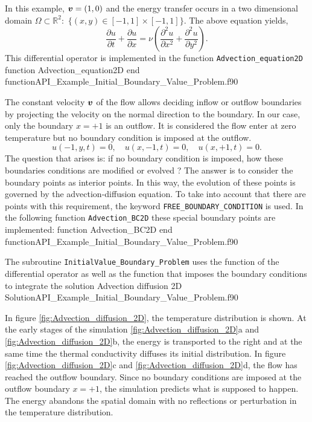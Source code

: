  In this example, $ \boldsymbol{v} = (1, 0) $ and the energy transfer occurs  in a two dimensional domain
  $\Omega \subset \mathbb{R}^2 : $ $\{(x,y)\in  [-1,1]\times[-1,1]\}$. The above equation yields, 
   \begin{equation*}
        \frac{\partial u}{\partial t} +  \frac{\partial u}{\partial x} = \nu \left( \frac{\partial^2 u}{\partial x^2} + \frac{\partial^2 u}{\partial y^2} \right). 
        \end{equation*}
 This differential operator is implemented in the function \verb|Advection_equation2D|
 \vspace{0.5cm} 
        {function Advection_equation2D}
        {end function}{API_Example_Initial_Boundary_Value_Problem.f90}
         
 
 The constant velocity $ \boldsymbol{v} $ of the flow allows deciding inflow or outflow boundaries by projecting the velocity on the normal direction to the boundary. In our case, only the boundary $ x=+1$ is an outflow.
 It is considered the flow enter at zero temperature but no boundary condition is imposed at the outflow. 
 $$
   u(-1, y, t) = 0, \quad u(x, -1, t ) = 0, \quad  u(x, +1, t ) = 0.
 $$   
 The question that arises is:  if no boundary condition is imposed, how these boundaries conditions are modified or evolved ? 
 The answer is to consider the boundary points as interior points. In this way, the evolution of these points is governed by the advection-diffusion equation. To take into account that there are points with this requirement, the keyword \verb|FREE_BOUNDARY_CONDITION| is used. 
 In the following function \verb|Advection_BC2D| these special boundary points are implemented:         
 \vspace{0.5cm} 
        {function Advection_BC2D}
        {end function}{API_Example_Initial_Boundary_Value_Problem.f90}             
      
     
 The subroutine \verb|InitialValue_Boundary_Problem| uses the function of the differential operator as well as the function that imposes the boundary conditions to integrate the solution    
        \vspace{0.5cm} 
        {Advection diffusion 2D}
        {Solution}{API_Example_Initial_Boundary_Value_Problem.f90}
        
   
 In figure \ref{fig:Advection_diffusion_2D}, the temperature distribution is shown. At the early stages of the simulation \ref{fig:Advection_diffusion_2D}a and \ref{fig:Advection_diffusion_2D}b, the energy is transported to the right and at the same time the thermal conductivity diffuses its initial distribution. In figure \ref{fig:Advection_diffusion_2D}c and \ref{fig:Advection_diffusion_2D}d,  the flow has reached the outflow boundary. Since no boundary conditions are imposed at the outflow boundary $ x=+1$, the simulation predicts what is supposed to happen. The energy abandons the spatial domain with no reflections or perturbation in the temperature distribution.   
      
